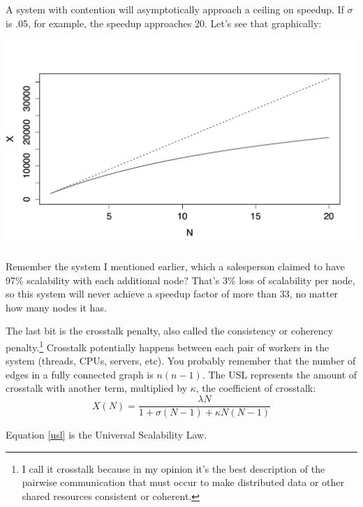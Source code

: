\documentclass{vivid_layout}
\begin{document}
A system with contention will
asymptotically approach a ceiling on speedup. If $\sigma$ is .05, for example,
the speedup approaches 20. Let's see that graphically:
\begin{center}
\includegraphics[width=.85\linewidth]{scalability/amdahl}
\end{center}

Remember the system I mentioned earlier, which a salesperson claimed to have
97\% scalability with each additional node? That's 3\% loss of scalability per
node, so this system will never achieve a speedup factor of more than 33, no
matter how many nodes it has.

The last bit is the crosstalk penalty, also called the consistency or coherency
penalty.\footnote{I call it crosstalk because in my opinion it's the best
description of the pairwise communication that must occur to make distributed
data or other shared resources consistent or coherent.} Crosstalk potentially
happens between each pair of workers in the system (threads, CPUs, servers,
etc).  You probably remember that the number of edges in a fully connected graph
is $n(n-1)$.  The USL represents the amount of crosstalk with another term, multiplied
by $\kappa$, the coefficient of crosstalk:
\begin{equation}
X(N) = \frac{\lambda N}{1 + \sigma(N-1) + \kappa N(N-1)}
\label{usl}
\end{equation}

Equation \ref{usl} is the Universal Scalability Law.
\end{document}
